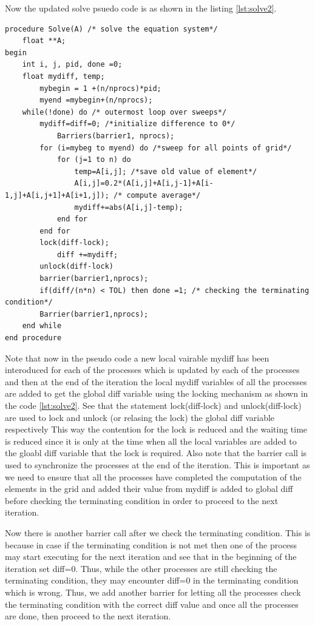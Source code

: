 \documentclass[12pt]{article}
\begin{document}
Now the updated solve psuedo code is as shown in the listing \ref{lst:solve2}.
\begin{lstlisting}[caption={Updated Solve Function},captionpos=b,label={lst:solve2}]
procedure Solve(A) /* solve the equation system*/
    float **A;
begin
    int i, j, pid, done =0;
    float mydiff, temp;
        mybegin = 1 +(n/nprocs)*pid;
        myend =mybegin+(n/nprocs);
    while(!done) do /* outermost loop over sweeps*/
        mydiff=diff=0; /*initialize difference to 0*/
            Barriers(barrier1, nprocs);
        for (i=mybeg to myend) do /*sweep for all points of grid*/
            for (j=1 to n) do
                temp=A[i,j]; /*save old value of element*/
                A[i,j]=0.2*(A[i,j]+A[i,j-1]+A[i-1,j]+A[i,j+1]+A[i+1,j]); /* compute average*/
                mydiff+=abs(A[i,j]-temp);
            end for
        end for
        lock(diff-lock);
            diff +=mydiff;
        unlock(diff-lock)
        barrier(barrier1,nprocs);
        if(diff/(n*n) < TOL) then done =1; /* checking the terminating condition*/
        Barrier(barrier1,nprocs);
    end while
end procedure
\end{lstlisting}
Note that now in the pseudo code a new local vairable mydiff has been interoduced for each of the processes
which is updated by each of the processes and then at the end of the iteration the local mydiff variables of all the processes are added to get the global diff variable
using the locking mechanism as shown in the code \ref{lst:solve2}. See that the statement lock(diff-lock) and unlock(diff-lock) are used to lock and unlock (or relasing the lock) 
the global diff variable respectively
This way the contention for the lock is reduced and the waiting time is reduced since it is only at the time when all the
local variables are added to the gloabl diff variable that the lock is required.
Also note that the barrier call is used to synchronize the processes at the end of the iteration. This is important as we need to ensure that all the processes have completed the computation of the elements in the grid and added 
their value from mydiff is added to global diff before checking the terminating condition in order to proceed to the next iteration.

Now there is another barrier call after we check the terminating condition. This is because in case if the terminating condition is not met then one of the process may 
start executing for the next iteration and see that in the beginning of the iteration set diff=0.
Thus, while the other processes are still checking the terminating condition, 
they may encounter diff=0 in the terminating condition which is wrong. Thus, we add another barrier for letting all the processes
check the terminating condition with the correct diff value and once all the processes are done, then proceed to the next iteration.
\end{document}

